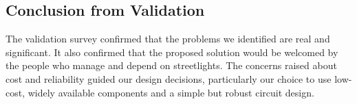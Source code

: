 \documentclass{article}
\begin{document}
\subsection{Conclusion from Validation}

The validation survey confirmed that the problems we identified are real and significant. It also confirmed that the proposed solution would be welcomed by the people who manage and depend on streetlights. The concerns raised about cost and reliability guided our design decisions, particularly our choice to use low-cost, widely available components and a simple but robust circuit design.
\end{document}

